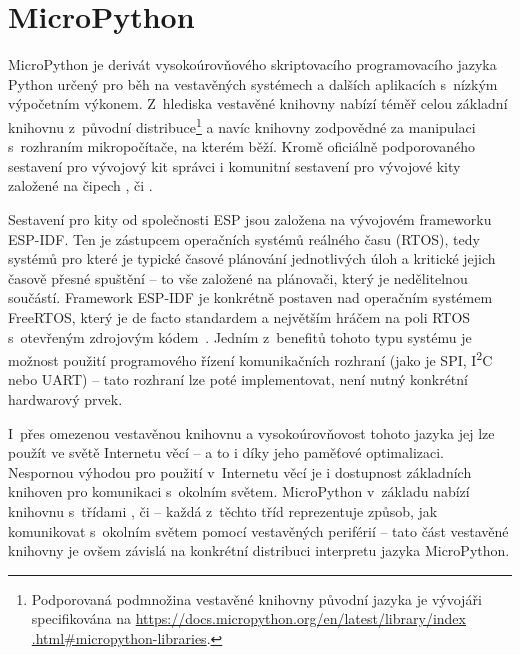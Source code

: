 \addtocounter{footnote}{-1}

\section{MicroPython}\label{sec:micropython}
MicroPython je derivát vysokoúrovňového skriptovacího programovacího jazyka Python určený pro běh na vestavěných
systémech a dalších aplikacích s~nízkým výpočetním výkonem.
Z~hlediska vestavěné knihovny nabízí téměř celou základní knihovnu z~původní distribuce\footnote{Podporovaná podmnožina
vestavěné knihovny původní jazyka je vývojáři specifikována na \url{https://docs.micropython.org/en/latest/library/index
.html\#micropython-libraries}.} a navíc knihovny
zodpovědné za manipulaci s~rozhraním mikropočítače, na kterém běží.
Kromě oficiálně podporovaného sestavení pro vývojový kit  správci i komunitní sestavení pro
vývojové kity založené na čipech ,  či .

Sestavení pro kity od společnosti ESP jsou založena na vývojovém frameworku ESP-IDF.
Ten je zástupcem operačních systémů reálného času (RTOS), tedy systémů pro které je typické časové plánování
jednotlivých úloh a kritické jejich časově přesné spuštění -- to vše založené na plánovači, který je
nedělitelnou součástí.
Framework ESP-IDF je konkrétně postaven nad operačním systémem FreeRTOS, který je de facto standardem a největším hráčem
na poli RTOS s~otevřeným zdrojovým kódem~\cite{RTOSSelection}.
Jedním z~benefitů tohoto typu systému je možnost použití programového řízení komunikačních rozhraní
(jako je SPI, I\textsuperscript{2}C nebo UART) -- tato rozhraní lze poté implementovat, není nutný konkrétní
hardwarový prvek.

I~přes omezenou vestavěnou knihovnu a vysokoúrovňovost tohoto jazyka jej lze použít ve světě Internetu věcí --
a to i díky jeho paměťové optimalizaci.
Nespornou výhodou pro použití v~Internetu věcí je i dostupnost základních knihoven pro komunikaci s~okolním světem.
MicroPython v~základu nabízí knihovnu  s~třídami ,  či  --
každá z~těchto tříd reprezentuje způsob, jak komunikovat s~okolním světem pomocí vestavěných periférií
-- tato část vestavěné knihovny je ovšem závislá na konkrétní distribuci interpretu jazyka MicroPython.

